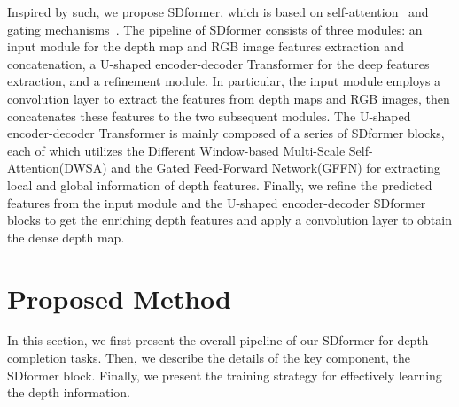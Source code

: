 \documentclass[conference]{IEEEtran}
\begin{document}
Inspired by such, we propose SDformer, which is based on self-attention~\cite{b3} and gating mechanisms~\cite{b13}. 
The pipeline of SDformer consists of three modules: an input module for the depth map and RGB image features extraction and concatenation, a U-shaped encoder-decoder Transformer for the deep features extraction, and a refinement module. In particular, the input module employs a convolution layer to extract the features from depth maps and RGB images, then concatenates these features to the two subsequent modules. The U-shaped encoder-decoder Transformer is mainly composed of a series of SDformer blocks, each of which utilizes the Different Window-based Multi-Scale Self-Attention(DWSA) and the Gated Feed-Forward Network(GFFN) for extracting local and global information of depth features. 
Finally, we refine the predicted features from the input module and the U-shaped encoder-decoder SDformer blocks to get the enriching depth features and apply a convolution layer to obtain the dense depth map.

\section{Proposed Method}
In this section, we first present the overall pipeline of our SDformer for depth completion tasks. Then, we describe the details of the key component, the SDformer block. Finally, we present the training strategy for effectively learning the depth information.
\end{document}

